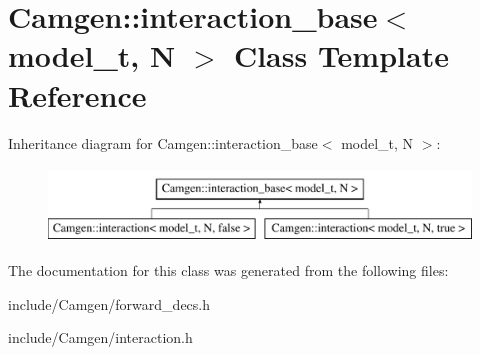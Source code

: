 \hypertarget{a00316}{}\section{Camgen\+:\+:interaction\+\_\+base$<$ model\+\_\+t, N $>$ Class Template Reference}
\label{a00316}
Inheritance diagram for Camgen\+:\+:interaction\+\_\+base$<$ model\+\_\+t, N $>$\+:\begin{figure}[H]
\begin{center}
\leavevmode
\includegraphics[height=2.000000cm]{a00316}
\end{center}
\end{figure}


The documentation for this class was generated from the following files\+:\begin{DoxyCompactItemize}
\item 
include/\+Camgen/forward\+\_\+decs.\+h\item 
include/\+Camgen/interaction.\+h\end{DoxyCompactItemize}
